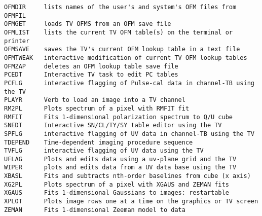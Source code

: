 \begin{verbatim}
OFMDIR     lists names of the user's and system's OFM files from OFMFIL
OFMGET     loads TV OFMS from an OFM save file
OFMLIST    lists the current TV OFM table(s) on the terminal or printer
OFMSAVE    saves the TV's current OFM lookup table in a text file
OFMTWEAK   interactive modification of current TV OFM lookup tables
OFMZAP     deletes an OFM lookup table save file
PCEDT      Interactive TV task to edit PC tables
PCFLG      interactive flagging of Pulse-cal data in channel-TB using the TV
PLAYR      Verb to load an image into a TV channel
RM2PL      Plots spectrum of a pixel with RMFIT fit
RMFIT      Fits 1-dimensional polarization spectrum to Q/U cube
SNEDT      Interactive SN/CL/TY/SY table editor using the TV
SPFLG      interactive flagging of UV data in channel-TB using the TV
TDEPEND    Time-dependent imaging procedure sequence
TVFLG      interactive flagging of UV data using the TV
UFLAG      Plots and edits data using a uv-plane grid and the TV
WIPER      plots and edits data from a UV data base using the TV
XBASL      Fits and subtracts nth-order baselines from cube (x axis)
XG2PL      Plots spectrum of a pixel with XGAUS and ZEMAN fits
XGAUS      Fits 1-dimensional Gaussians to images: restartable
XPLOT      Plots image rows one at a time on the graphics or TV screen
ZEMAN      Fits 1-dimensional Zeeman model to data
\end{verbatim}\eve


